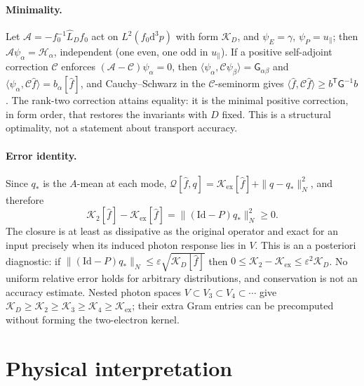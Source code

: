 \documentclass[11pt,a4paper]{article}
\numberwithin{equation}{section}
\newcommand{\dd}{\mathrm{d}}
\newcommand{\upar}{u_\parallel}
\newcommand{\fh}{\hat f}
\newcommand{\Kex}{\mathcal K_{\mathrm{ex}}}
\newcommand{\sH}{\mathscr H}
\begin{document}
\paragraph{Minimality.} Let $\mathcal A=-f_0^{-1}\hat L_Df_0$ act on $L^2(f_0\dd^3p)$
with form $\mathcal K_D$, and $\psi_E=\gamma$, $\psi_P=\upar$; then
$\mathcal A\psi_\alpha=\sH_\alpha$, independent (one even, one odd in $\upar$). If a
positive self-adjoint correction $\mathcal C$ enforces $(\mathcal A-\mathcal C)\psi_\alpha=0$,
then $\langle\psi_\alpha,\mathcal C\psi_\beta\rangle=\mathsf G_{\alpha\beta}$ and
$\langle\psi_\alpha,\mathcal C\fh\rangle=b_\alpha[\fh]$, and Cauchy--Schwarz in the
$\mathcal C$-seminorm gives $\langle\fh,\mathcal C\fh\rangle\ge b^{\mathsf T}\mathsf G^{-1}b$.
The rank-two correction attains equality: it is the minimal positive
correction, in form order, that restores the invariants with $D$ fixed. This is
a structural optimality, not a statement about transport accuracy.

\paragraph{Error identity.} Since $q_*$ is the $A$-mean at each mode,
$\mathcal Q[\fh,q]=\Kex[\fh]+\|q-q_*\|_N^2$, and therefore
\begin{equation}
\boxed{\mathcal K_2[\fh]-\Kex[\fh]=\|(\mathrm{Id}-P)q_*\|_N^2\ge0 .}
\end{equation}
The closure is at least as dissipative as the original operator and exact for
an input precisely when its induced photon response lies in $V$. This is an a
posteriori diagnostic: if $\|(\mathrm{Id}-P)q_*\|_N\le\varepsilon\sqrt{\mathcal K_D[\fh]}$
then $0\le\mathcal K_2-\Kex\le\varepsilon^2\mathcal K_D$. No uniform relative error
holds for arbitrary distributions, and conservation is not an accuracy
estimate. Nested photon spaces $V\subset V_3\subset V_4\subset\cdots$ give
$\mathcal K_D\ge\mathcal K_2\ge\mathcal K_3\ge\mathcal K_4\ge\Kex$; their extra Gram
entries can be precomputed without forming the two-electron kernel.

\section{Physical interpretation}\label{sec:interpretation}
\end{document}
